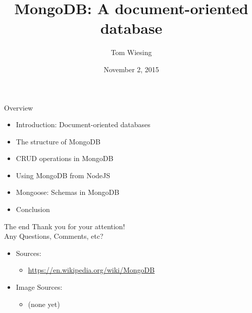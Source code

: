 \documentclass{beamer}
\title{MongoDB: A document-oriented database}
\author{Tom Wiesing}
\institute{Databases \& Web Applications}
\date{November 2, 2015}
\begin{document}
    \frame{\titlepage}

    \begin{frame}{Overview}
      \begin{itemize}
          \item Introduction: Document-oriented databases
          \item The structure of MongoDB
          \item CRUD operations in MongoDB
          \item Using MongoDB from NodeJS
          \item Mongoose: Schemas in MongoDB
          \item Conclusion
      \end{itemize}
    \end{frame}

    

    

    

    

    

    

    \begin{frame}{The end}
      {\huge
        Thank you for your attention!\\
        Any Questions, Comments, etc?
      }

      \begin{itemize}
        \item Sources:
        \begin{itemize}
          \item \url{https://en.wikipedia.org/wiki/MongoDB}
        \end{itemize}
        \item Image Sources:
        \begin{itemize}
          \item (none yet)
        \end{itemize}
      \end{itemize}
    \end{frame}
\end{document}
